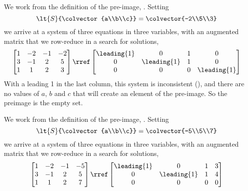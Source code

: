 We work from the definition of the pre-image, .   Setting 
%
\begin{equation*}
\lt{S}{\colvector{a\\b\\c}}=\colvector{-2\\5\\3}
\end{equation*}
%
we arrive at a system of three equations in three variables, with an augmented matrix that we row-reduce in a search for solutions,
%
\begin{equation*}
\begin{bmatrix}
 1 & -2 & -1 & -2 \\
 3 & -1 & 2 & 5 \\
 1 & 1 & 2 & 3
\end{bmatrix}
\rref
\begin{bmatrix}
 \leading{1} & 0 & 1 & 0 \\
 0 & \leading{1} & 1 & 0 \\
 0 & 0 & 0 & \leading{1}
\end{bmatrix}
\end{equation*}
%
With a leading 1 in the last column, this system is inconsistent (), and there are no values of $a$, $b$ and $c$ that will create an element of the pre-image.  So the preimage is the empty set.\par
%
We work from the definition of the pre-image, .   Setting 
%
\begin{equation*}
\lt{S}{\colvector{a\\b\\c}}=\colvector{-5\\5\\7}
\end{equation*}
%
we arrive at a system of three equations in three variables, with an augmented matrix that we row-reduce in a search for solutions,
%
\begin{equation*}
\begin{bmatrix}
 1 & -2 & -1 & -5 \\
 3 & -1 & 2 & 5 \\
 1 & 1 & 2 & 7
\end{bmatrix}
\rref
\begin{bmatrix}
 \leading{1} & 0 & 1 & 3 \\
 0 & \leading{1} & 1 & 4 \\
 0 & 0 & 0 & 0
\end{bmatrix}
\end{equation*}
